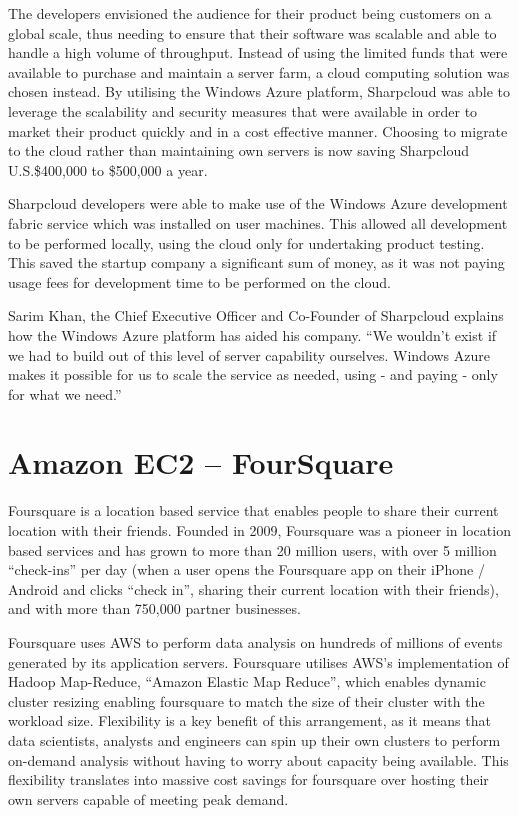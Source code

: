 The developers envisioned the audience for their product being customers on a global scale, thus needing to ensure that their software was scalable and able to handle a high volume of throughput. Instead of using the limited funds that were available to purchase and maintain a server farm, a cloud computing solution was chosen instead. By utilising the Windows Azure platform, Sharpcloud was able to leverage the scalability and security measures that were available in order to market their product quickly and in a cost effective manner. Choosing to migrate to the cloud rather than maintaining own servers is now saving Sharpcloud U.S.\$400,000 to \$500,000 a year.

Sharpcloud developers were able to make use of the Windows Azure development fabric service which was installed on user machines. This allowed all development to be performed locally, using the cloud only for undertaking product testing. This saved the startup company a significant sum of money, as it was not paying usage fees for development time to be performed on the cloud.

Sarim Khan, the Chief Executive Officer and Co-Founder of Sharpcloud explains how the Windows Azure platform has aided his company. ``We wouldn't exist if we had to build out of this level of server capability ourselves. Windows Azure makes it possible for us to scale the service as needed, using - and paying - only for what we need.''\ftSAzTwo
\ftSAzTwoText

\section{Amazon EC2 -- FourSquare}
Foursquare is a location based service that enables people to share their current location with their friends.  Founded in 2009, Foursquare was a pioneer in location based services and has grown to more than 20 million users, with over 5 million ``check-ins'' per day (when a user opens the Foursquare app on their iPhone / Android and clicks ``check in'', sharing their current location with their friends), and with more than 750,000 partner businesses\ftSAmOne.
\ftSAmOneText

Foursquare uses AWS to perform data analysis on hundreds of millions of events generated by its application servers.  Foursquare utilises AWS’s implementation of Hadoop Map-Reduce, ``Amazon Elastic Map Reduce'', which enables dynamic cluster resizing enabling foursquare to match the size of their cluster with the workload size.  Flexibility is a key benefit of this arrangement, as it means that data scientists, analysts and engineers can spin up their own clusters to perform on-demand analysis without having to worry about capacity being available.  This flexibility translates into massive cost savings for foursquare over hosting their own servers capable of meeting peak demand.

